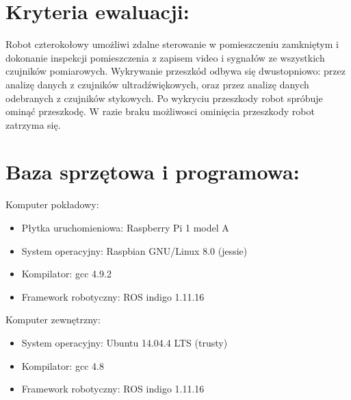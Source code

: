\documentclass[a4paper]{article}
\begin{document}
\section{ Kryteria ewaluacji:}

Robot czterokołowy umożliwi zdalne sterowanie w pomieszczeniu zamkniętym i dokonanie inspekcji pomieszczenia z zapisem video i sygnałów ze wszystkich czujników pomiarowych. Wykrywanie przeszkód odbywa się dwustopniowo: przez analizę danych z czujników ultradźwiękowych, oraz przez analizę danych odebranych z czujników stykowych. Po wykryciu przeszkody robot spróbuje ominąć przeszkodę. W razie braku możliwosci ominięcia przeszkody robot zatrzyma się.

\section{ Baza sprzętowa i programowa:}
Komputer pokładowy:
\begin{itemize}
\item Płytka uruchomieniowa: Raspberry Pi 1 model A
\item System operacyjny:     Raspbian GNU/Linux 8.0 (jessie)
\item Kompilator:            gcc 4.9.2
\item Framework robotyczny:  ROS indigo 1.11.16
\end{itemize}

Komputer zewnętrzny:
\begin{itemize}
\item System operacyjny:     Ubuntu 14.04.4 LTS (trusty)
\item Kompilator:            gcc 4.8
\item Framework robotyczny:  ROS indigo 1.11.16
\end{itemize}
\end{document}

